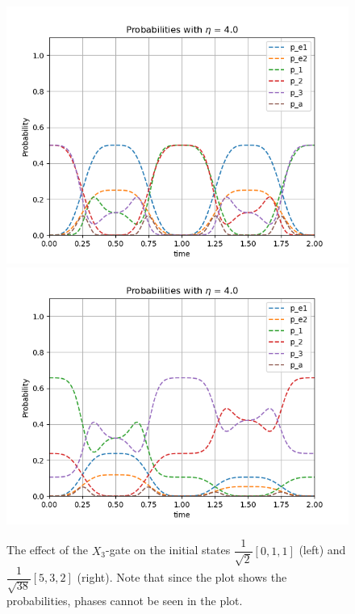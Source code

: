 \begin{figure}[H]
\label{fig:pop_X}
\includegraphics[scale=0.5]{figures/pop_plot_X011.png}
\includegraphics[scale=0.5]{figures/pop_plot_X532.png}
\caption{The effect of the $X_3$-gate on the initial states $\dfrac{1}{\sqrt{2}}[0,1,1]$ (left) and $\dfrac{1}{\sqrt{38}}[5,3,2]$ (right). Note that since the plot shows the probabilities, phases cannot be seen in the plot.}
\end{figure}

